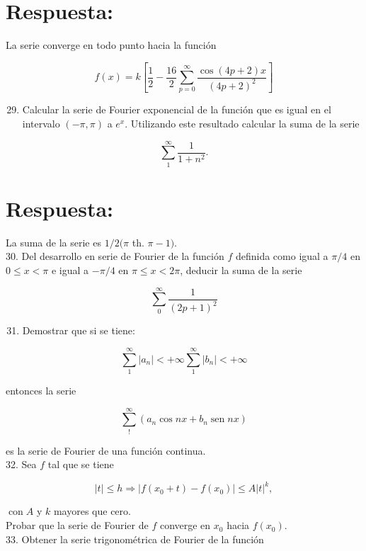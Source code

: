 \documentclass[10pt]{article}
\theoremstyle{plain}
\theoremstyle{definition}
\theoremstyle{remark}
\begin{document}
\section*{Respuesta:}
La serie converge en todo punto hacia la función

$$
f(x)=k\left[\frac{1}{2}-\frac{16}{2} \sum_{p=0}^{\infty} \frac{\cos (4 p+2) x}{(4 p+2)^{2}}\right]
$$

\begin{enumerate}
  \setcounter{enumi}{28}
  \item Calcular la serie de Fourier exponencial de la función que es igual en el intervalo $(-\pi, \pi)$ a $e^{x}$. Utilizando este resultado calcular la suma de la serie
\end{enumerate}

$$
\sum_{1}^{\infty} \frac{1}{1+n^{2}} .
$$

\section*{Respuesta:}
La suma de la serie es $1 / 2(\pi$ th. $\pi-1)$.\\
30. Del desarrollo en serie de Fourier de la función $f$ definida como igual a $\pi / 4$ en $0 \leqslant x<\pi$ e igual a $-\pi / 4$ en $\pi \leqslant x<2 \pi$, deducir la suma de la serie

$$
\sum_{0}^{\infty} \frac{1}{(2 p+1)^{2}}
$$

\begin{enumerate}
  \setcounter{enumi}{30}
  \item Demostrar que si se tiene:
\end{enumerate}

$$
\sum_{1}^{\infty}\left|a_{n}\right|<+\infty \sum_{1}^{\infty}\left|b_{n}\right|<+\infty
$$

entonces la serie

$$
\sum_{!}^{\infty}\left(a_{n} \cos n x+b_{n} \operatorname{sen} n x\right)
$$

es la serie de Fourier de una función continua.\\
32. Sea $f$ tal que se tiene

$$
|t| \leqslant h \Rightarrow\left|f\left(x_{0}+t\right)-f\left(x_{0}\right)\right| \leqslant A|t|^{k},
$$

$\operatorname{con} A$ y $k$ mayores que cero.\\
Probar que la serie de Fourier de $f$ converge en $x_{0}$ hacia $f\left(x_{0}\right)$.\\
33. Obtener la serie trigonométrica de Fourier de la función
\end{document}

